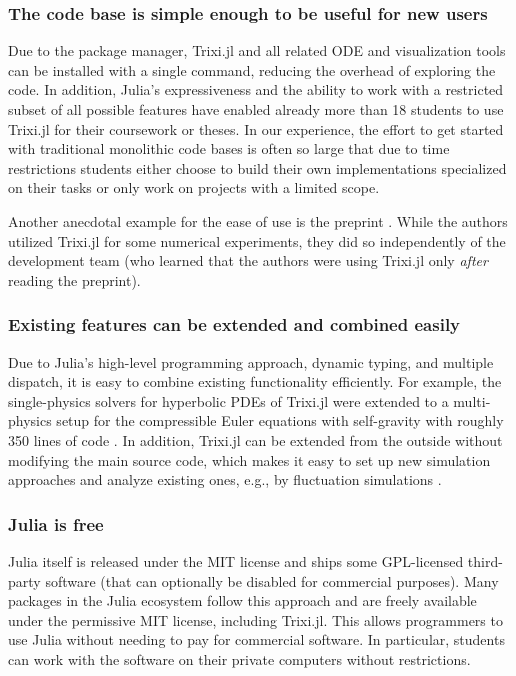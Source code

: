 \documentclass[hidelinks]{juliacon} %
\makeatletter
\newcommand{\eg}[0]{{e.g.\@}\xspace}
\newcommand{\trixi}{Trixi.jl\xspace}
\makeatother
\begin{document}
\subsubsection{The code base is simple enough to be useful for new users}

Due to the package manager, \trixi and all related ODE and visualization tools
can be installed with a single command, reducing the overhead of exploring the
code. In addition, Julia's expressiveness and the ability to work with a restricted
subset of all possible features have enabled already more than 18 students to use \trixi
for their coursework or theses. In our experience, the effort to get
started with traditional monolithic code bases is often so large that due to time restrictions
students either choose to build their own implementations specialized on their tasks or only work on
projects with a limited scope.

Another anecdotal example for the ease of use is the preprint \cite{singh2021linear}.
While the authors utilized \trixi for some numerical experiments, they did so
independently of the development team (who learned that the authors were
using \trixi only \textit{after} reading the preprint).

\subsubsection{Existing features can be extended and combined easily}

Due to Julia's high-level programming approach, dynamic typing, and multiple
dispatch, it is easy to combine existing functionality efficiently. For example,
the single-physics solvers for hyperbolic PDEs of \trixi were extended to
a multi-physics setup for the compressible Euler equations with self-gravity
with roughly 350 lines of code \cite{schlottkelakemper2021purely}.
In addition, \trixi can be extended from the outside without modifying the main
source code, which makes it easy to set up new simulation approaches and analyze
existing ones, \eg, by fluctuation simulations \cite{ranocha2021preventing}.

\subsubsection{Julia is free}

Julia itself is released under the MIT license and ships some GPL-licensed
third-party software (that can optionally be disabled for commercial purposes).
Many packages in the Julia ecosystem follow this approach and are freely available
under the permissive MIT license, including \trixi. This allows programmers to use Julia
without needing to pay for commercial software. In particular, students can
work with the software on their private computers without restrictions.
\end{document}

